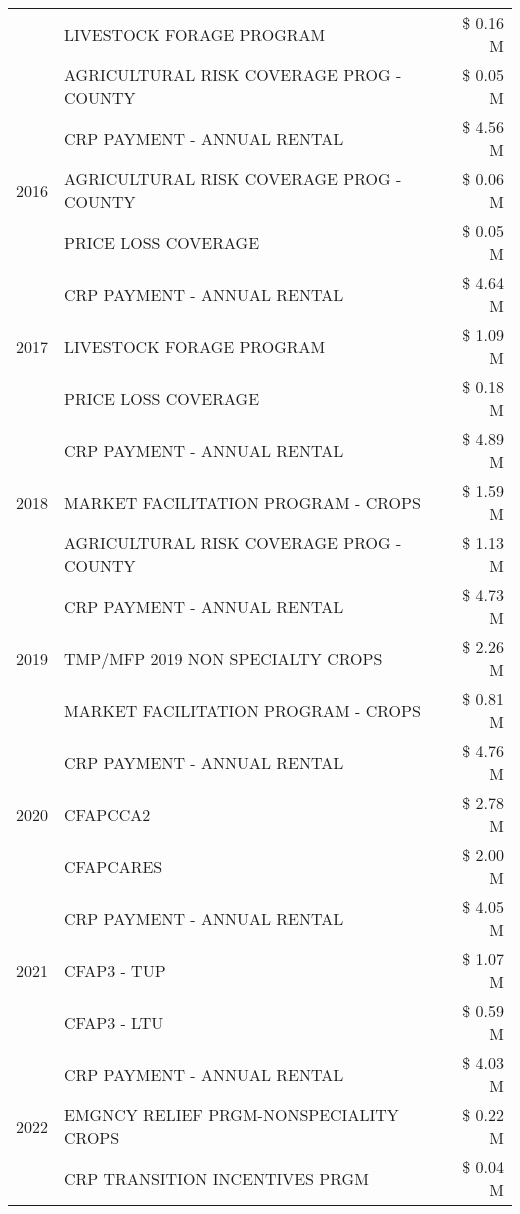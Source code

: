 \begin{tabular}{llr}
 & LIVESTOCK FORAGE PROGRAM & \$ 0.16 M \\
 & AGRICULTURAL RISK COVERAGE PROG - COUNTY & \$ 0.05 M \\
\cline{1-3}
\multirow[t]{3}{*}{2016} & CRP PAYMENT - ANNUAL RENTAL & \$ 4.56 M \\
 & AGRICULTURAL RISK COVERAGE PROG - COUNTY & \$ 0.06 M \\
 & PRICE LOSS COVERAGE & \$ 0.05 M \\
\cline{1-3}
\multirow[t]{3}{*}{2017} & CRP PAYMENT - ANNUAL RENTAL & \$ 4.64 M \\
 & LIVESTOCK FORAGE PROGRAM & \$ 1.09 M \\
 & PRICE LOSS COVERAGE & \$ 0.18 M \\
\cline{1-3}
\multirow[t]{3}{*}{2018} & CRP PAYMENT - ANNUAL RENTAL & \$ 4.89 M \\
 & MARKET FACILITATION PROGRAM - CROPS & \$ 1.59 M \\
 & AGRICULTURAL RISK COVERAGE PROG - COUNTY & \$ 1.13 M \\
\cline{1-3}
\multirow[t]{3}{*}{2019} & CRP PAYMENT - ANNUAL RENTAL & \$ 4.73 M \\
 & TMP/MFP 2019 NON SPECIALTY CROPS & \$ 2.26 M \\
 & MARKET FACILITATION PROGRAM - CROPS & \$ 0.81 M \\
\cline{1-3}
\multirow[t]{3}{*}{2020} & CRP PAYMENT - ANNUAL RENTAL & \$ 4.76 M \\
 & CFAPCCA2 & \$ 2.78 M \\
 & CFAPCARES & \$ 2.00 M \\
\cline{1-3}
\multirow[t]{3}{*}{2021} & CRP PAYMENT - ANNUAL RENTAL & \$ 4.05 M \\
 & CFAP3 - TUP & \$ 1.07 M \\
 & CFAP3 - LTU & \$ 0.59 M \\
\cline{1-3}
\multirow[t]{3}{*}{2022} & CRP PAYMENT - ANNUAL RENTAL & \$ 4.03 M \\
 & EMGNCY RELIEF PRGM-NONSPECIALITY CROPS & \$ 0.22 M \\
 & CRP TRANSITION INCENTIVES PRGM & \$ 0.04 M \\
\cline{1-3}
\bottomrule
\end{tabular}
